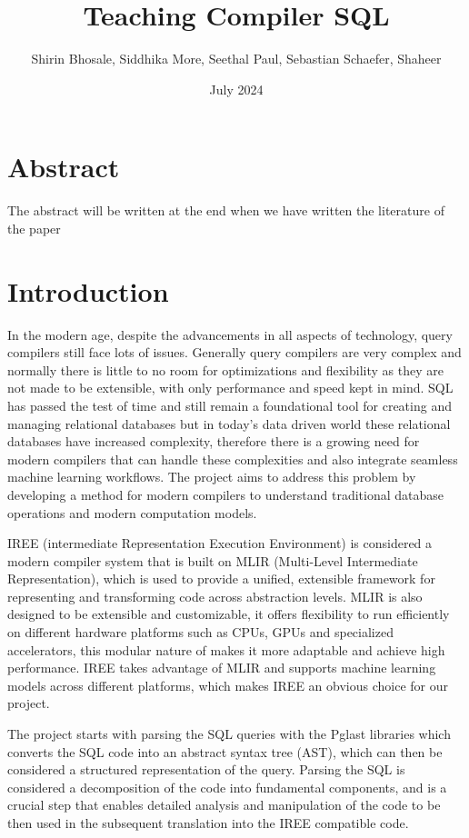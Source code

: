 \documentclass{article}
\title{Teaching Compiler SQL}
\author{Shirin Bhosale, Siddhika More, Seethal Paul, Sebastian Schaefer, Shaheer}
\date{July 2024}
\begin{document}
  
\maketitle
  
\tableofcontents

\section*{Abstract}

The abstract will be written at the end when we have written the literature of the paper

\section{Introduction}
In the modern age, despite the advancements in all aspects of technology, query compilers still face lots of issues. Generally query compilers are very complex and normally there is little to no room for optimizations and flexibility as they are not made to be extensible, with only performance and speed kept in mind. SQL has passed the test of time and still remain a foundational tool for creating and managing relational databases but in today's data driven world these relational databases have increased complexity, therefore there is a growing need for modern compilers that can handle these complexities and also integrate seamless machine learning workflows. The project aims to address this problem by developing a method for modern compilers to understand traditional database operations and modern computation models.

IREE (intermediate Representation Execution Environment) is considered a modern compiler system that is built on MLIR (Multi-Level Intermediate Representation), which is used to provide a unified, extensible framework for representing and transforming code across abstraction levels. MLIR is also designed to be extensible and customizable, it offers flexibility to run efficiently on different hardware platforms such as CPUs, GPUs and specialized accelerators, this modular nature of makes it more adaptable and achieve high performance. IREE takes advantage of MLIR and supports machine learning models across different platforms, which makes IREE an obvious choice for our project.

The project starts with parsing the SQL queries with the Pglast libraries which converts the SQL code into an abstract syntax tree (AST), which can then be considered a structured representation of the query. Parsing the SQL is considered a decomposition of the code into fundamental components, and is a crucial step that enables detailed analysis and manipulation of the code to be then used in the subsequent translation into the IREE compatible code.
\end{document}
